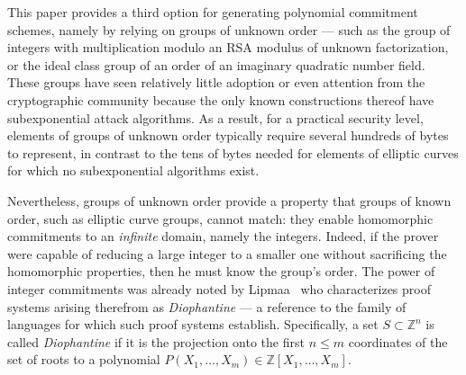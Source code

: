 This paper provides a third option for generating polynomial commitment schemes, namely by relying on groups of unknown order --- such as the group of integers with multiplication modulo an RSA modulus of unknown factorization, or the ideal class group of an order of an imaginary quadratic number field. These groups have seen relatively little adoption or even attention from the cryptographic community because the only known constructions thereof have subexponential attack algorithms. As a result, for a practical security level, elements of groups of unknown order typically require several hundreds of bytes to represent, in contrast to the tens of bytes needed for elements of elliptic curves for which no subexponential algorithms exist. 

Nevertheless, groups of unknown order provide a property that groups of known order, such as elliptic curve groups, cannot match: they enable homomorphic  commitments to an \emph{infinite} domain, namely the integers. Indeed, if the prover were capable of reducing a large integer to a smaller one without sacrificing the homomorphic properties, then he must know the group's order. The power of integer commitments was already noted by Lipmaa~\cite{AC:Lipmaa03b} who characterizes proof systems arising therefrom as \emph{Diophantine} --- a reference to the family of languages for which such proof systems establish. Specifically, a set $S \subset \mathbb{Z}^n$ is called \emph{Diophantine} if it is the projection onto the first $n \leq m$ coordinates of the set of roots to a polynomial $P(X_1, \ldots, X_m) \in \mathbb{Z}[X_1, \ldots, X_m]$.%


